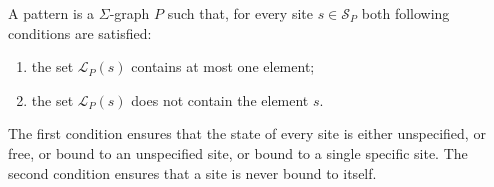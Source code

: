 \documentclass{entcs}
\newcommand{\keep}[3]{#1{#2}{#3}}
\newcommand{\graphsymb}{G}
\newcommand{\sites}[1][\graphsymb]{\mathcal{S}_{#1}}
\newcommand{\links}[1][\graphsymb]{\mathcal{L}_{#1}}
\begin{document}


\begin{defn}[patterns]
A pattern is a $\Sigma$-graph $P$ such that, for every site $s\in\sites[P]$ both following conditions are satisfied:
\begin{enumerate}
\item the set $\links[P](s)$ contains at most one element;
\item the set $\links[P](s)$ does not contain the element $s$.
\end{enumerate}
\end{defn}
The first condition ensures that the state of every site is either unspecified,
or free, or bound to an unspecified site, or bound to a single specific site. The second condition ensures that a site is never bound to itself.
\end{document}

